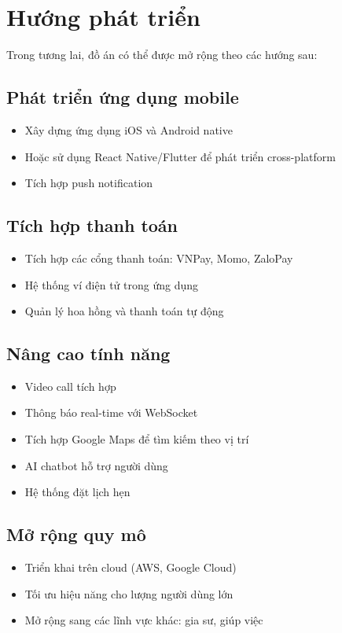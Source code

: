 \documentclass[12pt,a4paper]{report}
\begin{document}
\section{Hướng phát triển}

Trong tương lai, đồ án có thể được mở rộng theo các hướng sau:

\subsection{Phát triển ứng dụng mobile}
\begin{itemize}
    \item Xây dựng ứng dụng iOS và Android native
    \item Hoặc sử dụng React Native/Flutter để phát triển cross-platform
    \item Tích hợp push notification
\end{itemize}

\subsection{Tích hợp thanh toán}
\begin{itemize}
    \item Tích hợp các cổng thanh toán: VNPay, Momo, ZaloPay
    \item Hệ thống ví điện tử trong ứng dụng
    \item Quản lý hoa hồng và thanh toán tự động
\end{itemize}

\subsection{Nâng cao tính năng}
\begin{itemize}
    \item Video call tích hợp
    \item Thông báo real-time với WebSocket
    \item Tích hợp Google Maps để tìm kiếm theo vị trí
    \item AI chatbot hỗ trợ người dùng
    \item Hệ thống đặt lịch hẹn
\end{itemize}

\subsection{Mở rộng quy mô}
\begin{itemize}
    \item Triển khai trên cloud (AWS, Google Cloud)
    \item Tối ưu hiệu năng cho lượng người dùng lớn
    \item Mở rộng sang các lĩnh vực khác: gia sư, giúp việc
\end{itemize}
\end{document}
